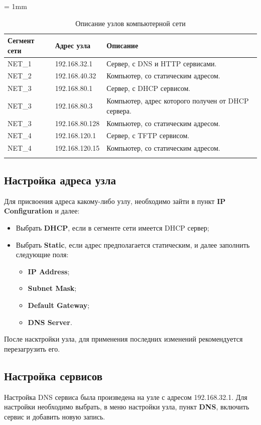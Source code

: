 \documentclass[a4paper, 12pt]{article}		%
\begin{document}
\tabulinesep = 1mm
\begin{longtabu} to \textwidth {|X[2, c , m ] |X[3,c , m ] | X[10, l, m ]|}\firsthline\hline
\textbf{Сегмент сети}&\textbf{Адрес узла}&\textbf{Описание}\\ \hline \endfirsthead
NET\_1&192.168.32.1&Сервер, с DNS и HTTP сервисами.\\ \hline
NET\_2&192.168.40.32&Компьютер, со статическим адресом.\\ \hline
NET\_3&192.168.80.1&Сервер, с DHCP сервисом.\\ \hline
NET\_3&192.168.80.3&Компьютер, адрес которого получен от DHCP сервера.\\ \hline
NET\_3&192.168.80.128&Компьютер, со статическим адресом.\\ \hline
NET\_4&192.168.120.1&Сервер, с TFTP сервисом.\\ \hline
NET\_4&192.168.120.15&Компьютер, со статическим адресом.\\ \hline
\caption{Описание узлов компьютерной сети}
\end{longtabu}

\subsection{Настройка адреса узла}
Для присвоения адреса какому-либо узлу, необходимо зайти в пункт \textbf{IP Configuration} и далее:
\begin{itemize}
\item Выбрать \textbf{DHCP}, если в сегменте сети имеется DHCP сервер;
\item Выбрать \textbf{Static}, если адрес предполагается статическим, и далее заполнить следующие поля:
\begin{itemize}
\item \textbf{IP Address};
\item \textbf{Subnet Mask};
\item \textbf{Default Gateway};
\item \textbf{DNS Server}.
\end{itemize}
\end{itemize}
После насктройки узла, для применения последних изменений рекомендуется перезагрузить его.

\subsection{Настройка сервисов}
Настройка DNS сервиса была произведена на узле с адресом 192.168.32.1. Для настройки необходимо выбрать, в меню настройки узла, пункт \textbf{DNS}, включить сервис и добавить новую запись. 
\end{document}
